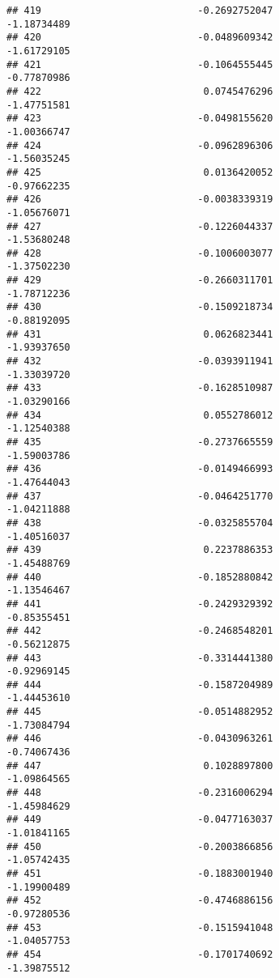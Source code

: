 \documentclass[
]{article}
\begin{document}
\begin{verbatim}
## 419                           -0.2692752047                -1.18734489
## 420                           -0.0489609342                -1.61729105
## 421                           -0.1064555445                -0.77870986
## 422                            0.0745476296                -1.47751581
## 423                           -0.0498155620                -1.00366747
## 424                           -0.0962896306                -1.56035245
## 425                            0.0136420052                -0.97662235
## 426                           -0.0038339319                -1.05676071
## 427                           -0.1226044337                -1.53680248
## 428                           -0.1006003077                -1.37502230
## 429                           -0.2660311701                -1.78712236
## 430                           -0.1509218734                -0.88192095
## 431                            0.0626823441                -1.93937650
## 432                           -0.0393911941                -1.33039720
## 433                           -0.1628510987                -1.03290166
## 434                            0.0552786012                -1.12540388
## 435                           -0.2737665559                -1.59003786
## 436                           -0.0149466993                -1.47644043
## 437                           -0.0464251770                -1.04211888
## 438                           -0.0325855704                -1.40516037
## 439                            0.2237886353                -1.45488769
## 440                           -0.1852880842                -1.13546467
## 441                           -0.2429329392                -0.85355451
## 442                           -0.2468548201                -0.56212875
## 443                           -0.3314441380                -0.92969145
## 444                           -0.1587204989                -1.44453610
## 445                           -0.0514882952                -1.73084794
## 446                           -0.0430963261                -0.74067436
## 447                            0.1028897800                -1.09864565
## 448                           -0.2316006294                -1.45984629
## 449                           -0.0477163037                -1.01841165
## 450                           -0.2003866856                -1.05742435
## 451                           -0.1883001940                -1.19900489
## 452                           -0.4746886156                -0.97280536
## 453                           -0.1515941048                -1.04057753
## 454                           -0.1701740692                -1.39875512

\end{verbatim}
\end{document}
